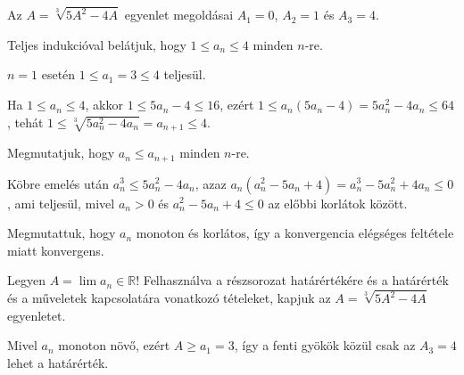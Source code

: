 \documentclass[11pt]{scrartcl}
\begin{document}
Az $A = \sqrt[3]{5A^2 - 4A}$ egyenlet megoldásai $A_1 = 0$, $A_2 = 1$ és
$A_3 = 4$.

Teljes indukcióval belátjuk, hogy $1 \le a_n \le 4$ minden $n$-re.

$n = 1$ esetén $1 \le a_1 = 3 \le 4$ teljesül.

Ha $1 \le a_n \le 4$, akkor $1 \le 5a_n - 4 \le 16$, ezért
$1 \le a_n (5a_n - 4) = 5a_n^2 - 4a_n \le 64$, tehát
$1 \le \sqrt[3]{5a_n^2 - 4a_n} = a_{n + 1} \le 4$.

Megmutatjuk, hogy $a_n \le a_{n + 1}$ minden $n$-re.

Köbre emelés után $a_n^3 \le 5a_n^2 - 4a_n$, azaz
$a_n (a_n^2 - 5a_n + 4) = a_n^3 - 5a_n^2 + 4a_n \le 0$, ami teljesül, mivel
$a_n > 0$ és $a_n^2 - 5a_n + 4 \le 0$ az előbbi korlátok között.

Megmutattuk, hogy $a_n$ monoton és korlátos, így a konvergencia elégséges
feltétele miatt konvergens.

Legyen $A = \lim a_n \in \mathbb{R}$! Felhasználva a részsorozat
határértékére és a határérték és a műveletek kapcsolatára vonatkozó
tételeket, kapjuk az $A = \sqrt[3]{5A^2 - 4A}$ egyenletet.

Mivel $a_n$ monoton növő, ezért $A \ge a_1 = 3$, így a fenti gyökök közül
csak az $A_3 = 4$ lehet a határérték.
\end{document}
